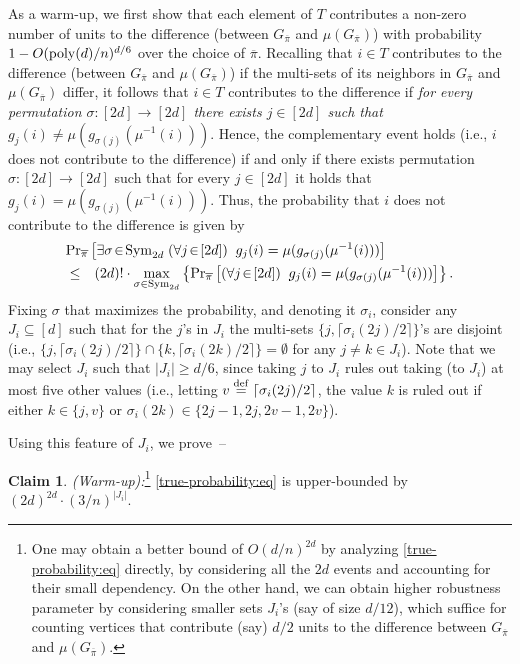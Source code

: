 \documentclass[10pt,a4paper]{article}
\theoremstyle{definition}
\newcommand{\prob}{{\rm Pr}}
\newcommand{\imu}{{\mu^{-1}}}
\newcommand{\ceil}[1]{{\lceil#1\rceil}}
\newcommand{\eqdef}{\stackrel{\rm def}{=}}
\newcommand{\ov}{\overline}
\newtheorem{techclm}{Claim}[subsection]
\newcommand{\Bcm}{\begin{techclm}}   \newcommand{\Ecm}{\end{techclm}}
\newcommand{\poly}{{\rm poly}}
\newcommand{\Sym}{{\rm Sym}}
\begin{document}
As a warm-up, we first show that each element of $T$
contributes a non-zero number of units to the difference
(between $G_{\ov\pi}$ and $\mu(G_{\ov\pi})$)
with probability $1-O(\poly(d)/n)^{d/6}$ over the choice of $\ov\pi$.
%
%
%
%
%
%
%
%
Recalling that $i\in T$ contributes to the difference
(between $G_{\ov\pi}$ and $\mu(G_{\ov\pi})$)
if the multi-sets of its neighbors in $G_{\ov\pi}$
and $\mu(G_{\ov\pi})$ differ,
it follows that $i\in T$ contributes to the difference if
{\em for every permutation $\sigma:[2d]\to[2d]$
there exists $j\in[2d]$
such that $g_j(i)\neq\mu(g_{\sigma(j)}(\imu(i)))$}.
%
%
%
%
Hence, the complementary event holds
(i.e., $i$ does not contribute to the difference)
if and only if there exists permutation $\sigma:[2d]\to[2d]$
such that for every $j\in[2d]$
it holds that $g_j(i)=\mu(g_{\sigma(j)}(\imu(i)))$.
%
%
%
%
%
%
%
Thus, the probability that $i$ does not contribute to the difference
is given by
\begin{eqnarray}
\lefteqn{\prob_{\ov\pi}
  \left[\exists\sigma\!\in\!\Sym_{2d}\;
        (\forall j\!\in\![2d])\;\;g_j(i)=\mu(g_{\sigma(j)}(\imu(i)))\right]}
\nonumber \\
&\leq& (2d)!\cdot\max_{\sigma\in\Sym_{2d}}
  \left\{\prob_{\ov\pi}\left[(\forall j\!\in\![2d])\;\;
            g_j(i)=\mu(g_{\sigma(j)}(\imu(i)))\right] \right\}.
\label{true-probability:eq}
\end{eqnarray}
Fixing $\sigma$ that maximizes the probability,
and denoting it $\sigma_i$,
%
%
consider any $J_i\subseteq[d]$ such that for the $j$'s in $J_i$
the multi-sets $\{j,\ceil{\sigma_i(2j)/2}\}$'s are disjoint
(i.e., $\{j,\ceil{\sigma_i(2j)/2}\}\cap\{k,\ceil{\sigma_i(2k)/2}\}=\emptyset$
for any $j\neq k\in J_i$).
Note that we may select $J_i$ such that $|J_i|\geq d/6$,
since taking $j$ to $J_i$ rules out taking (to $J_i$)
at most five other values (i.e., letting $v\eqdef\ceil{\sigma_i(2j)/2}$,
the value $k$ is ruled out if either $k\in\{j,v\}$
or $\sigma_i(2k)\in\{2j-1,2j,2v-1,2v\}$).
%
%
%
%
%
%
%
%















Using this feature of $J_i$, we prove~--

\setcounter{subsection}{1}

\Bcm{\em(Warm-up):}\footnote{One may obtain a better bound
of $O(d/n)^{2d}$ by analyzing \eqref{true-probability:eq} directly,
by considering all the $2d$ events and accounting for their small dependency.
On the other hand, we can obtain higher robustness parameter
by considering smaller sets $J_i$'s (say of size $d/12$),
which suffice for counting vertices that
contribute (say) $d/2$ units to the difference
between $G_{\ov\pi}$ and $\mu(G_{\ov\pi})$.\label{random-bd:fn}}
%
%
%
\label{random-works-warm-up:clm}
\eqref{true-probability:eq} is upper-bounded
by $(2d)^{2d}\cdot(3/n)^{|J_i|}$.
\Ecm
\end{document}
